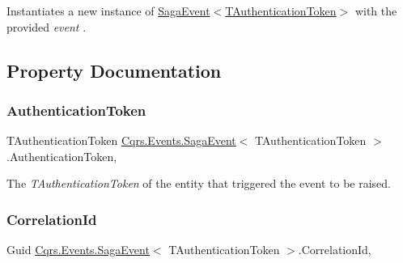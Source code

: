 Instantiates a new instance of \hyperlink{classCqrs_1_1Events_1_1SagaEvent_a658ce04baccb816bf132702cccaa6a90_a658ce04baccb816bf132702cccaa6a90}{Saga\+Event$<$\+T\+Authentication\+Token$>$} with the provided {\itshape event} . 



\subsection{Property Documentation}
\mbox{\label{classCqrs_1_1Events_1_1SagaEvent_a9b5abd2cc59f97f53eaa2c2277733e7f_a9b5abd2cc59f97f53eaa2c2277733e7f}} 
\subsubsection{\texorpdfstring{Authentication\+Token}{AuthenticationToken}}
{\footnotesize\ttfamily T\+Authentication\+Token \hyperlink{classCqrs_1_1Events_1_1SagaEvent}{Cqrs.\+Events.\+Saga\+Event}$<$ T\+Authentication\+Token $>$.Authentication\+Token\hspace{0.3cm}{\ttfamily [get]}, {\ttfamily [set]}}



The {\itshape T\+Authentication\+Token}  of the entity that triggered the event to be raised. 

\mbox{\label{classCqrs_1_1Events_1_1SagaEvent_a3bd1014469c88b763173da28a7d5023c_a3bd1014469c88b763173da28a7d5023c}} 
\subsubsection{\texorpdfstring{Correlation\+Id}{CorrelationId}}
{\footnotesize\ttfamily Guid \hyperlink{classCqrs_1_1Events_1_1SagaEvent}{Cqrs.\+Events.\+Saga\+Event}$<$ T\+Authentication\+Token $>$.Correlation\+Id\hspace{0.3cm}{\ttfamily [get]}, {\ttfamily [set]}}



